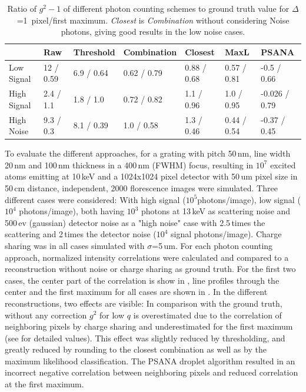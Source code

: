 \begin{table}
	\caption[Ratio of $g^2-1$ of different photon counting schemes to ground truth value]{Ratio of $g^2-1$ of different photon counting schemes to ground truth value  for $\Delta$=1\, pixel/first maximum. \textit{Closest} is \textit{Combination} without considering Noise photons, giving good results in the low noise cases.}
	\label{tab:photonrecon}
	
	\begin{adjustwidth}{-1em}{-2em}	
		\small
		\begin{tabular}{lllllll}
			\toprule
			&        Raw &       Threshold &         Combination &      Closest &         MaxL &          PSANA \\
			\midrule
			Low Signal  &  12 / 0.59 &  6.9 / 0.64 &  0.62 / 0.79 &  0.88 / 0.68 &  0.57 / 0.81 &    -0.5 / 0.66 \\
			High Signal &  2.4 / 1.1 &   1.8 / 1.0 &  0.72 / 0.82 &   1.1 / 0.96 &   1.0 / 0.95 &  -0.026 / 0.79 \\
			High Noise  &  9.3 / 0.3 &  8.1 / 0.39 &   1.0 / 0.58 &   1.3 / 0.46 &  0.44 / 0.54 &   -0.37 / 0.45 \\
			\bottomrule
		\end{tabular}
	\end{adjustwidth}
\end{table}

To evaluate the different approaches, for a grating with pitch 50\,nm, line width 20\,nm and 100\,nm thickness in a 400\,nm (FWHM) focus, resulting in $10^7$ excited atoms emitting at 10\,keV and a 1024x1024 pixel detector with 50\,um pixel size in 50\,cm distance, independent, 2000 florescence images were simulated. Three different cases were considered: With high signal ($10^5 $photons/image), low signal ($10^4$ photons/image), both having $10^3$ photons at 13\,keV as scattering noise and 500\,ev (gaussian) detector noise as a "high noise" case  with 2.5\,times the scattering and 2\,times the detector noise  ($10^4$ signal photons/image). Charge sharing was in all cases simulated with $\sigma$=5\,um.  For each photon counting approach, normalized intensity correlations were calculated and compared to a reconstruction without noise or charge sharing as ground truth. For the first two cases, the center part of the correlation is show in , line profiles through the center and the first maximum for all cases are shown in . In the different reconstructions, two effects are visible: In comparison with the ground truth, without any correction $g^2$ for low $q$ is overestimated due to the correlation of neighboring pixels by charge sharing and underestimated for the first maximum (see  for detailed values). This effect was slightly reduced by thresholding, and greatly reduced by rounding to the closest combination as well as by the maximum likelihood classification. The PSANA droplet algorithm resulted in an incorrect negative correlation between neighboring pixels and reduced correlation at the first maximum.

